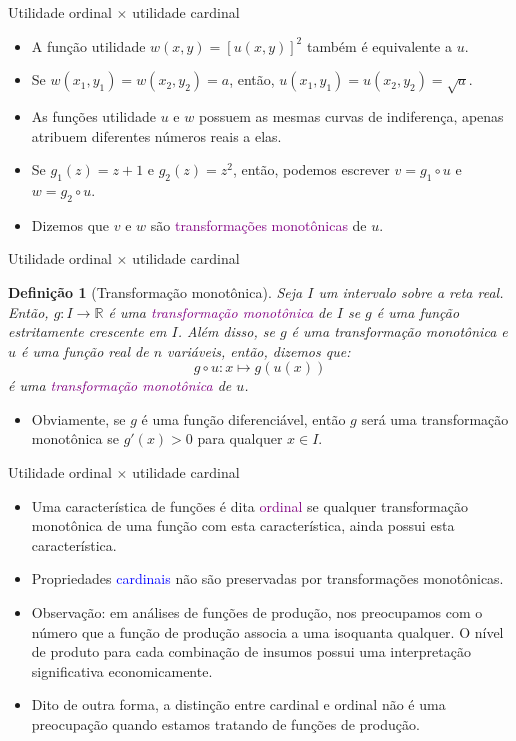 \documentclass[10pt]{beamer}
\newtheorem{defi}{Definição}
\begin{document}
\begin{frame}{Utilidade ordinal $\times$ utilidade cardinal}
    \begin{itemize}
        \item A função utilidade $w(x,y) = [u(x,y)]^2$ também é equivalente a $u$.
        \bigskip
        \item Se $w(x_1, y_1) = w(x_2, y_2) = a$, então, $u(x_1, y_1) = u(x_2, y_2) = \sqrt{a}$.
        \bigskip
        \item As funções utilidade $u$ e $w$ possuem as mesmas curvas de indiferença, apenas atribuem diferentes números reais a elas.
        \bigskip
        \item Se $g_1(z) = z + 1$ e $g_2(z) = z^2$, então, podemos escrever $v = g_1 \circ u$ e $w = g_2 \circ u$.
        \bigskip
        \item Dizemos que $v$ e $w$ são \textcolor{purple}{transformações monotônicas} de $u$.
    \end{itemize}    
\end{frame}

\begin{frame}{Utilidade ordinal $\times$ utilidade cardinal}
    \begin{defi}[Transformação monotônica]
        Seja $I$ um intervalo sobre a reta real. Então, $g: I \to \mathbb{R}$ é uma \textcolor{purple}{transformação monotônica} de $I$ se $g$ é uma função estritamente crescente em $I$. Além disso, se $g$ é uma transformação monotônica e $u$ é uma função real de $n$ variáveis, então, dizemos que:
        \[
          g \circ u: x \mapsto g(u(x))  
        \]
        é uma \textcolor{purple}{transformação monotônica} de $u$.
    \end{defi}
    \begin{itemize}
        \item Obviamente, se $g$ é uma função diferenciável, então $g$ será uma transformação monotônica se $g'(x) > 0$ para qualquer $x \in I$.
    \end{itemize}
\end{frame}

\begin{frame}{Utilidade ordinal $\times$ utilidade cardinal}
    \begin{itemize}
        \item Uma característica de funções é dita \textcolor{purple}{ordinal} se qualquer transformação monotônica de uma função com esta característica, ainda possui esta característica.
        \bigskip
        \item Propriedades \textcolor{blue}{cardinais} não são preservadas por transformações monotônicas.
        \bigskip
        \item Observação: em análises de funções de produção, nos preocupamos com o número que a função de produção associa a uma isoquanta qualquer. O nível de produto para cada combinação de insumos possui uma interpretação significativa economicamente.
        \bigskip
        \item Dito de outra forma, a distinção entre cardinal e ordinal não é uma preocupação quando estamos tratando de funções de produção.
    \end{itemize}    
\end{frame}
\end{document}
